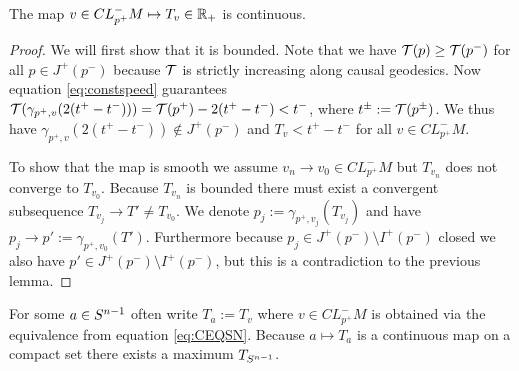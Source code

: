 \begin{lemma}
    The map $v\in CL^-_{p^+}M\mapsto T_v\in \mathbb{R}_+$ is continuous.
\end{lemma}
\begin{proof}
    We will first show that it is bounded. Note that we have ${\mathcal{T}}(p)\ge {\mathcal{T}}(p^-)$ for all $p\in J^+(p^-)$ because ${\mathcal{T}}$ is strictly increasing along causal geodesics. Now equation \ref{eq:constspeed} guarantees ${\mathcal{T}}(\gamma_{p^+,v}(2(t^+-t^-)))= {\mathcal{T}}(p^+)-2(t^+-t^-) < t^-$, where $t^\pm := {\mathcal{T}}(p^\pm)$. We thus have $\gamma_{p^+,v}(2(t^+-t^-))\notin J^+(p^-)$ and $T_v < t^+-t^-$ for all $v\in CL^-_{p^+}M$.

    To show that the map is smooth we assume $v_n \to v_0 \in CL^-_{p^+}M$ but $T_{v_n}$ does not converge to $T_{v_0}$. Because $T_{v_n}$ is bounded there must exist a convergent subsequence $T_{v_j}\to T'\neq T_{v_0}$. We denote $p_j:=\gamma_{p^+,v_j}(T_{v_j})$ and have $p_j\to p':=\gamma_{p^+,v_0}(T')$. Furthermore because $p_j\in J^+(p^-)\setminus I^+(p^-)$ closed we also have $p'\in J^+(p^-)\setminus I^+(p^-)$, but this is a contradiction to the previous lemma.
\end{proof}
For some $a\in {S^{n-1}}$ often write $T_a:=T_v$ where $v\in CL^-_{p^+}M$ is obtained via the equivalence from equation \ref{eq:CEQSN}. Because $a\mapsto T_a$ is a continuous map on a compact set there exists a maximum $T_{S^{n-1}}$.

